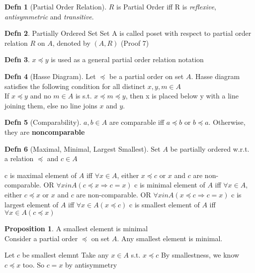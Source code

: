 \documentclass[a4paper]{article}
\theoremstyle{definition}
\newtheorem*{defn}{Defn}
\newtheorem*{propos}{Proposition}
\begin{document}
\begin{defn}[Partial Order Relation]
  $R$ is Partial Order iff R is \textit{reflexive}, \textit{antisymmetric} and \textit{transitive}.
\end{defn}

\begin{defn}{Partially Ordered Set}
  Set A is called poset with respect to partial order relation $R$ on $A$, denoted by $(A, R)$ (Proof 7)
\end{defn}

\begin{defn}{$x \preccurlyeq y$}
  is used as a general partial order relation notation
\end{defn}

\begin{defn}[Hasse Diagram]
  Let $\preccurlyeq$ be a partial order on set $A$. Hasse diagram satisfies the following condition for all distinct $x, y, m \in A$ \\
  If $x \preccurlyeq y$ and no $m \in A$ is s.t. $x \preccurlyeq m \preccurlyeq y$, then x is placed below y with a line joining them, else no line joins $x$ and $y$.
\end{defn}

\begin{defn}[Comparability]
  $a, b \in A$ are comparable iff $a \preccurlyeq b$ or $b \preccurlyeq a$. Otherwise, they are \textbf{noncomparable}
\end{defn}

\begin{defn}[Maximal, Minimal, Largest Smallest]
  Set $A$ be partially ordered w.r.t. a relation $\preccurlyeq$ and $c \in A$
  \begin{numpf}
    \pfln c is maximal element of $A$ iff $\forall x \in A$, either $x \preccurlyeq c$ or $x$ and $c$ are non-comparable. OR $\forall x in A(c \preccurlyeq x \Rightarrow c = x)$
    \pfln c is minimal element of $A$ iff $\forall x \in A$, either $c \preccurlyeq x$ or $x$ and $c$ are non-comparable. OR $\forall x in A(x \preccurlyeq c \Rightarrow c = x)$
    \pfln c is largest element of $A$ iff $\forall x \in A (x \preccurlyeq c)$
    \pfln c is smallest element of $A$ iff $\forall x \in A (c \preccurlyeq x)$
  \end{numpf}
\end{defn}

\begin{propos} A smallest element is minimal\\
  Consider a partial order $\preccurlyeq$ on set $A$. Any smallest element is minimal. 
  \begin{numpf}
    \pfln Let $c$ be smallest elemnt
    \pfln Take any $x \in A$ s.t. $x \preccurlyeq c$
    \pfln By smallestness, we know $c \preccurlyeq x$ too.
    \pfln So $c = x$ by antisymmetry
  \end{numpf}
\end{propos}
\end{document}
